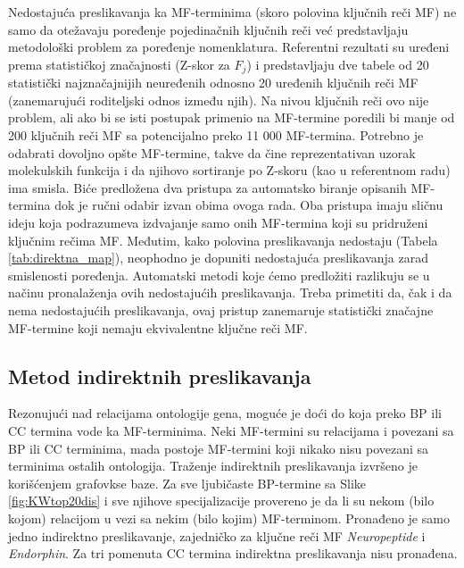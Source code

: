 Nedostajuća preslikavanja ka MF-terminima (skoro polovina ključnih reči MF) ne
samo da otežavaju poređenje pojedinačnih ključnih reči već predstavljaju
metodološki problem za poređenje nomenklatura.  Referentni rezultati su uređeni
prema statističkoj značajnosti (Z-skor za $F_j$) i predstavljaju dve tabele od
20 statistički najznačajnijih neuređenih odnosno 20 uređenih ključnih reči MF
(zanemarujući roditeljski odnos između njih). Na nivou ključnih reči ovo nije
problem, ali ako bi se isti postupak primenio na MF-termine poredili bi manje
od 200 ključnih reči MF sa potencijalno preko 11 000 MF-termina. Potrebno je
odabrati dovoljno opšte MF-termine, takve da čine reprezentativan uzorak
molekulskih funkcija i da njihovo sortiranje po Z-skoru (kao u referentnom
radu) ima smisla.  Biće predložena dva pristupa za automatsko biranje opisanih
MF-termina dok je ručni odabir izvan obima ovoga rada.  Oba pristupa imaju
sličnu ideju koja podrazumeva izdvajanje samo onih MF-termina koji su
pridruženi ključnim rečima MF.  Međutim, kako polovina preslikavanja nedostaju
(Tabela \ref{tab:direktna_map}), neophodno je dopuniti nedostajuća
preslikavanja zarad smislenosti poređenja.  Automatski metodi koje ćemo
predložiti razlikuju se u načinu pronalaženja ovih nedostajućih preslikavanja.
Treba primetiti da, čak i da nema nedostajućih preslikavanja, ovaj pristup
zanemaruje statistički značajne MF-termine koji nemaju ekvivalentne ključne
reči MF. 



\clearpage

\subsection{Metod indirektnih preslikavanja}

Rezonujući nad relacijama ontologije gena, moguće je doći do
 koja preko BP ili CC termina vode ka
MF-terminima. Neki MF-termini su relacijama  i
 povezani sa BP ili CC terminima, mada postoje MF-termini
koji nikako nisu povezani sa terminima ostalih  ontologija. Traženje
indirektnih preslikavanja izvršeno je korišćenjem  grafovkse
baze.  Za sve ljubičaste BP-termine sa Slike \ref{fig:KWtop20dis} i sve njihove
specijalizacije provereno je da li su nekom (bilo kojom) relacijom u vezi sa
nekim (bilo kojim) MF-terminom. Pronađeno je samo jedno indirektno
preslikavanje, zajedničko za ključne reči MF \textit{Neuropeptide} i
\textit{Endorphin}. Za tri pomenuta CC termina indirektna preslikavanja nisu
pronađena. 


